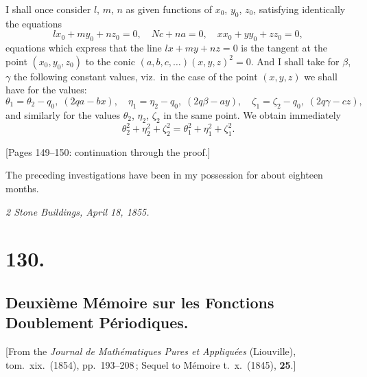 \documentclass[11pt,a4paper]{book}
\begin{document}
I shall once consider $l$, $m$, $n$ as given functions of $x_0$, $y_0$, $z_0$, satisfying identically
the equations
\[
l x_0 + m y_0 + n z_0 = 0,\quad N c + n a = 0,\quad x x_0 + y y_0 + z z_0 = 0,
\]
equations which express that the line $lx + my + nz = 0$ is the tangent at the point $(x_0, y_0, z_0)$
to the conic $(a, b, c, \ldots)(x, y, z)^2 = 0$. And I shall take for $\beta$, $\gamma$ the following constant
values, viz.\ in the case of the point $(x, y, z)$ we shall have for the values:
\[
\theta_1=\theta_2-q_0,\;(2qa-bx),\quad\eta_1=\eta_2-q_0,\;(2q\beta-ay),\quad\zeta_1=\zeta_2 - q_0,\;(2q\gamma-cz),
\]
and similarly for the values $\theta_2$, $\eta_2$, $\zeta_2$ in the same point. We obtain immediately
\[
\theta_2^2 + \eta_2^2 + \zeta_2^2 = \theta_1^2 + \eta_1^2 + \zeta_1^2.
\]

\medskip

[Pages 149--150: continuation through the proof.]

\medskip

The preceding investigations have been in my possession for about eighteen months.

\medskip
\noindent\textit{2 Stone Buildings, April 18, 1855.}

\section*{130.}
\subsection*{Deuxi\`eme M\'emoire sur les Fonctions Doublement P\'eriodiques.}

[From the \textit{Journal de Math\'ematiques Pures et Appliqu\'ees} (Liouville), tom.\ xix.\ (1854),
pp.\ 193--208\,; Sequel to M\'emoire t.\ x.\ (1845), \textbf{25}.]

\medskip
\end{document}
